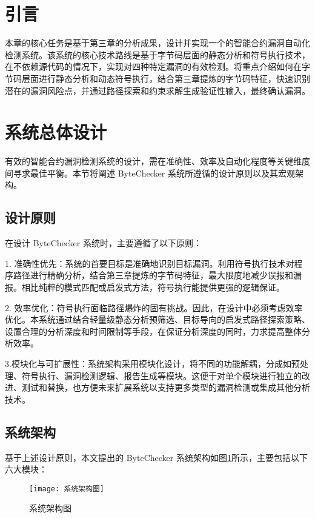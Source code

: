 \documentclass[print, master, vlined, timesmath]{DissertUESTC}
\begin{document}
\section{引言}

本章的核心任务是基于第三章的分析成果，设计并实现一个的智能合约漏洞自动化检测系统。该系统的核心技术路线是基于字节码层面的静态分析和符号执行技术，在不依赖源代码的情况下，实现对四种特定漏洞的有效检测。将重点介绍如何在字节码层面进行静态分析和动态符号执行，结合第三章提炼的字节码特征，快速识别潜在的漏洞风险点，并通过路径探索和约束求解生成验证性输入，最终确认漏洞。

\section{系统总体设计}


有效的智能合约漏洞检测系统的设计，需在准确性、效率及自动化程度等关键维度间寻求最佳平衡。本节将阐述 ByteChecker 系统所遵循的设计原则以及其宏观架构。

\subsection{设计原则}

在设计 ByteChecker 系统时，主要遵循了以下原则：

1. 准确性优先：系统的首要目标是准确地识别目标漏洞。利用符号执行技术对程序路径进行精确分析，结合第三章提炼的字节码特征，最大限度地减少误报和漏报。相比纯粹的模式匹配或启发式方法，符号执行能提供更强的逻辑保证。

2. 效率优化：符号执行面临路径爆炸的固有挑战。因此，在设计中必须考虑效率优化。本系统通过结合轻量级静态分析预筛选、目标导向的启发式路径探索策略、设置合理的分析深度和时间限制等手段，在保证分析深度的同时，力求提高整体分析效率。

3.模块化与可扩展性：系统架构采用模块化设计，将不同的功能解耦，分成如预处理、符号执行、漏洞检测逻辑、报告生成等模块。这便于对单个模块进行独立的改进、测试和替换，也方便未来扩展系统以支持更多类型的漏洞检测或集成其他分析技术。

\subsection{系统架构}

基于上述设计原则，本文提出的 ByteChecker 系统架构如图\ref{fig:系统架构图}所示，主要包括以下六大模块：

\begin{figure}[htbp]
    \centering
    \texttt{[image: 系统架构图]}
    \caption{系统架构图}
    \label{fig:系统架构图}
\end{figure}
\end{document}
